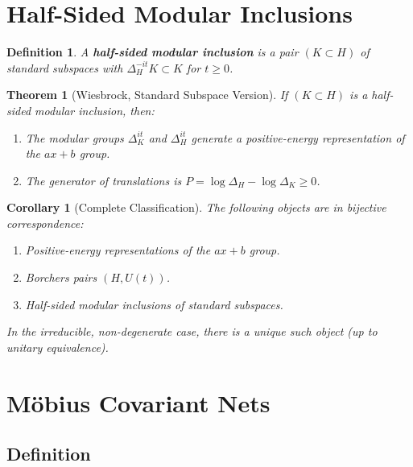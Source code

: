 \documentclass[11pt,a4paper]{article}
\newtheorem{definition}{Definition}[section]
\newtheorem{theorem}{Theorem}[section]
\newtheorem{corollary}{Corollary}[section]
\begin{document}
\section{Half-Sided Modular Inclusions}

\begin{definition}
A \textbf{half-sided modular inclusion} is a pair $(K \subset H)$ of
standard subspaces with $\Delta_H^{-it} K \subset K$ for $t \geq 0$.
\end{definition}

\begin{theorem}[Wiesbrock, Standard Subspace Version]
If $(K \subset H)$ is a half-sided modular inclusion, then:
\begin{enumerate}[nosep]
  \item The modular groups $\Delta_K^{it}$ and $\Delta_H^{it}$ generate
        a positive-energy representation of the $ax+b$ group.
  \item The generator of translations is
        $P = \log\Delta_H - \log\Delta_K \geq 0$.
\end{enumerate}
\end{theorem}

\begin{corollary}[Complete Classification]
The following objects are in bijective correspondence:
\begin{enumerate}[nosep]
  \item Positive-energy representations of the $ax+b$ group.
  \item Borchers pairs $(H, U(t))$.
  \item Half-sided modular inclusions of standard subspaces.
\end{enumerate}
In the irreducible, non-degenerate case, there is a unique such object
(up to unitary equivalence).
\end{corollary}

\section{M\"obius Covariant Nets}

\subsection{Definition}
\end{document}
